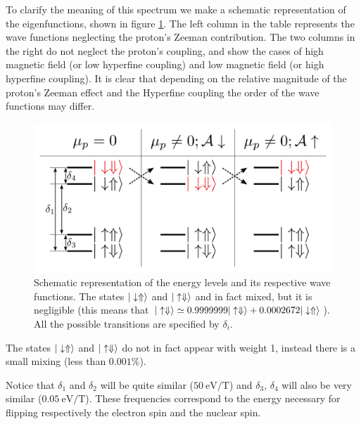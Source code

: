 To clarify the meaning of this spectrum we make a schematic representation of the eigenfunctions, shown in figure \ref{levels}. The left column in the table represents the wave functions neglecting the proton's Zeeman contribution. The two columns in the right do not neglect the proton's coupling, and show the cases of high magnetic field (or low hyperfine coupling) and low magnetic field (or high hyperfine coupling). It is clear that depending on the relative magnitude of the proton's Zeeman effect and the Hyperfine coupling the order of the wave functions may differ.
\begin{figure}[h!]
\centering
\includegraphics{chapter03/figures/levels.png}
\vspace{-5pt}
\caption{Schematic representation of the energy levels and its respective wave functions. The states $|\downarrow\Uparrow\rangle$ and $|\uparrow\Downarrow\rangle$ and in fact mixed, but it is negligible (this means that $|\uparrow\Downarrow\rangle\simeq0.9999999|\uparrow\Downarrow\rangle+0.0002672|\downarrow\Uparrow\rangle$). All the possible transitions are specified by $\delta_i$.}
\label{levels}
\end{figure}
\FloatBarrier
The states $|\downarrow\Uparrow\rangle$ and $|\uparrow\Downarrow\rangle$ do not in fact appear with weight 1, instead there is a small mixing (less than $0.001\%$).

Notice that $\delta_1$ and $\delta_2$ will be quite similar ($\SI{50}{\eV\per\tesla}$) and $\delta_3$, $\delta_4$ will also be very similar ($\SI{0.05}{\eV\per\tesla}$). These frequencies correspond to the energy necessary for flipping respectively the electron spin and the nuclear spin.



